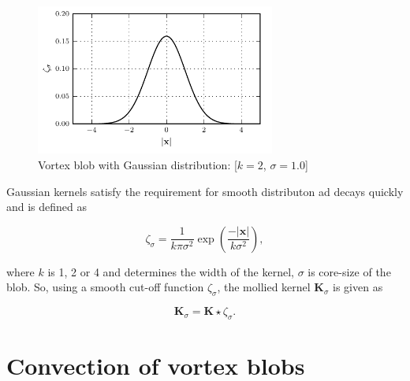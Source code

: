 	\begin{figure}[h]
	\centering
	\includegraphics[width=0.7\textwidth]{figures/lagrangian/gaussianKernel.pdf}
	\caption{Vortex blob with Gaussian distribution: [$k=2$, $\sigma=1.0$]}
	\label{fig:gaussianDistribution}
	\end{figure}

Gaussian kernels satisfy the requirement for smooth distributon ad decays quickly and is defined as
	
	\begin{equation}
	\zeta_{\sigma} = \frac{1}{k\pi\sigma^2}\exp\left(\frac{-\left|\mathbf{x}\right|}{k\sigma^2}\right),
	\end{equation}

where $k$ is 1, 2 or 4 and determines the width of the kernel, $\sigma$ is core-size of the blob. So, using a smooth cut-off function $\zeta_{\sigma}$, the mollied kernel $\mathbf{K}_{\sigma}$ is given as 

	\begin{equation}
	\mathbf{K}_{\sigma} = \mathbf{K} \star \zeta_{\sigma}.
	\end{equation}

%
%
%
\section{Convection of vortex blobs}

